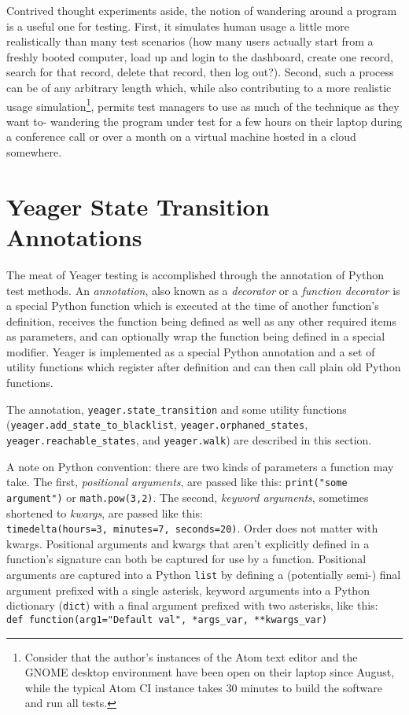 Contrived thought experiments aside, the notion of wandering around a program is a useful one for testing. First, it simulates human usage a little more realistically than many test scenarios (how many users actually start from a freshly booted computer, load up and login to the dashboard, create one record, search for that record, delete that record, then log out?). Second, such a process can be of any arbitrary length which, while also contributing to a more realistic usage simulation\footnote{Consider that the author's instances of the Atom text editor and the GNOME desktop environment have been open on their laptop since August, while the typical Atom CI instance takes 30 minutes to build the software and run all tests.\citep{CircleCI}}, permits test managers to use as much of the technique as they want to- wandering the program under test for a few hours on their laptop during a conference call or over a month on a virtual machine hosted in a cloud somewhere.

\section{Yeager State Transition Annotations}
The meat of Yeager testing is accomplished through the annotation of Python test methods. An \textit{annotation}, also known as a \textit{decorator} or a \textit{function decorator} is a special Python function which is executed at the time of another function's definition, receives the function being defined as well as any other required items as parameters, and can optionally wrap the function being defined in a special modifier. Yeager is implemented as a special Python annotation and a set of utility functions which register after definition and can then call plain old Python functions.

The annotation, \texttt{yeager.state\_transition} and some utility functions \\(\texttt{yeager.add\_state\_to\_blacklist}, \texttt{yeager.orphaned\_states}, \\\texttt{yeager.reachable\_states}, and \texttt{yeager.walk}) are described in this section.

A note on Python convention: there are two kinds of parameters a function may take. The first, \textit{positional arguments}, are passed like this: \texttt{print("some argument")} or \texttt{math.pow(3,2)}. The second, \textit{keyword arguments}, sometimes shortened to \textit{kwargs}, are passed like this:
\\\texttt{timedelta(hours=3, minutes=7, seconds=20)}. Order does not matter with kwargs. Positional arguments and kwargs that aren't explicitly defined in a function's signature can both be captured for use by a function. Positional arguments are captured into a Python \texttt{list} by defining a (potentially semi-) final argument prefixed with a single asterisk, keyword arguments into a Python dictionary (\texttt{dict}) with a final argument prefixed with two asterisks, like this:
\\\texttt{def function(arg1="Default val", *args\_var, **kwargs\_var)}


